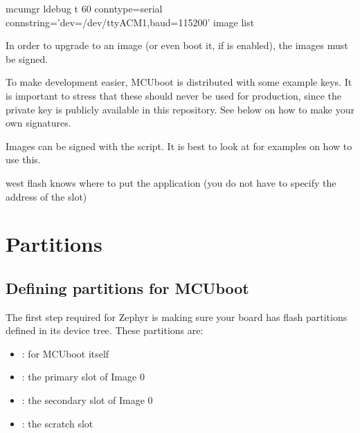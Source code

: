 \documentclass[letterpaper,10pt,english]{sphinxmanual}
\begin{document}
mcumgr \sphinxhyphen{}ldebug \sphinxhyphen{}t 60 \textendash{}conntype=serial \textendash{}connstring=’dev=/dev/ttyACM1,baud=115200’ image list

In order to upgrade to an image (or even boot it, if
 is enabled), the images must be signed.

To make development easier, MCUboot is distributed with some example
keys.  It is important to stress that these should never be used for
production, since the private key is publicly available in this
repository.  See below on how to make your own signatures.

Images can be signed with the  script.  It is best
to look at  for examples on how to use this.

west flash knows where to put the application (you do not have to specify the address of the slot)


\section{Partitions}
\label{\detokenize{fota/partitions:partitions}}\label{\detokenize{fota/partitions:signing}}\label{\detokenize{fota/partitions::doc}}
\begin{sphinxVerbatim}[commandchars=\\\{\}]
\end{sphinxVerbatim}


\subsection{Defining partitions for MCUboot}
\label{\detokenize{fota/partitions:defining-partitions-for-mcuboot}}
The first step required for Zephyr is making sure your board has flash
partitions defined in its device tree. These partitions are:
\begin{itemize}
\item {} 
: for MCUboot itself

\item {} 
: the primary slot of Image 0

\item {} 
: the secondary slot of Image 0

\item {} 
: the scratch slot

\end{itemize}
\end{document}
